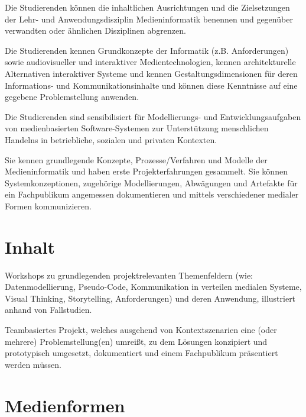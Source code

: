Die Studierenden können die inhaltlichen Ausrichtungen und die
Zielsetzungen der Lehr- und Anwendungsdisziplin Medieninformatik
benennen und gegenüber verwandten oder ähnlichen Disziplinen abgrenzen.

Die Studierenden kennen Grundkonzepte der Informatik (z.B.
Anforderungen) sowie audiovisueller und interaktiver Medientechnologien,
kennen architekturelle Alternativen interaktiver Systeme und kennen
Gestaltungsdimensionen für deren Informations- und Kommunikationsinhalte
und können diese Kenntnisse auf eine gegebene Problemstellung anwenden.

Die Studierenden sind sensibilisiert für Modellierungs- und
Entwicklungsaufgaben von medienbasierten Software-Systemen zur
Unterstützung menschlichen Handelns in betriebliche, sozialen und
privaten Kontexten.

Sie kennen grundlegende Konzepte, Prozesse/Verfahren und Modelle der
Medieninformatik und haben erste Projekterfahrungen gesammelt. Sie
können Systemkonzeptionen, zugehörige Modellierungen, Abwägungen und
Artefakte für ein Fachpublikum angemessen dokumentieren und mittels
verschiedener medialer Formen kommunizieren.

\hypertarget{inhaltpathlabel....srcmodulbeschreibungen-bachelor-bpo5ba_einfhrungindiemedieninformatik}{%
\section*{Inhalt\label{../../src/modulbeschreibungen-bachelor-bpo5/BA_EinfhrungindieMedieninformatik}}\label{inhaltpathlabel....srcmodulbeschreibungen-bachelor-bpo5ba_einfhrungindiemedieninformatik}}

Workshops zu grundlegenden projektrelevanten Themenfeldern (wie:
Datenmodellierung, Pseudo-Code, Kommunikation in verteilen medialen
Systeme, Visual Thinking, Storytelling, Anforderungen) und deren
Anwendung, illustriert anhand von Fallstudien.

Teambasiertes Projekt, welches ausgehend von Kontextszenarien eine (oder
mehrere) Problemstellung(en) umreißt, zu dem Lösungen konzipiert und
prototypisch umgesetzt, dokumentiert und einem Fachpublikum präsentiert
werden müssen.

\hypertarget{medienformenpathlabel....srcmodulbeschreibungen-bachelor-bpo5ba_einfhrungindiemedieninformatik}{%
\section*{Medienformen\label{../../src/modulbeschreibungen-bachelor-bpo5/BA_EinfhrungindieMedieninformatik}}\label{medienformenpathlabel....srcmodulbeschreibungen-bachelor-bpo5ba_einfhrungindiemedieninformatik}}

